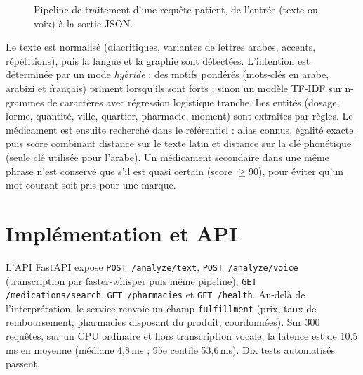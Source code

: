 \documentclass[11pt,a4paper]{article}
\begin{document}
\begin{figure}[htbp]
\caption{Pipeline de traitement d'une requ\^ete patient, de l'entr\'ee (texte ou voix) \`a la sortie JSON.}
\label{fig:pipeline}
\end{figure}
Le texte est normalis\'e (diacritiques, variantes de lettres arabes, accents, r\'ep\'etitions), puis la langue et la graphie sont d\'etect\'ees. L'intention est d\'etermin\'ee par un mode \emph{hybride} : des motifs pond\'er\'es (mots-cl\'es en arabe, arabizi et fran\c{c}ais) priment lorsqu'ils sont forts ; sinon un mod\`ele TF-IDF sur n-grammes de caract\`eres avec r\'egression logistique tranche. Les entit\'es (dosage, forme, quantit\'e, ville, quartier, pharmacie, moment) sont extraites par r\`egles. Le m\'edicament est ensuite recherch\'e dans le r\'ef\'erentiel : alias connus, \'egalit\'e exacte, puis score combinant distance sur le texte latin et distance sur la cl\'e phon\'etique (seule cl\'e utilis\'ee pour l'arabe). Un m\'edicament secondaire dans une m\^eme phrase n'est conserv\'e que s'il est quasi certain (score $\geq 90$), pour \'eviter qu'un mot courant soit pris pour une marque.

\section{Impl\'ementation et API}
L'API FastAPI expose \texttt{POST /analyze/text}, \texttt{POST /analyze/voice} (transcription par faster-whisper puis m\^eme pipeline), \texttt{GET /medications/search}, \texttt{GET /pharmacies} et \texttt{GET /health}. Au-del\`a de l'interpr\'etation, le service renvoie un champ \texttt{fulfillment} (prix, taux de remboursement, pharmacies disposant du produit, coordonn\'ees). Sur 300 requ\^etes, sur un CPU ordinaire et hors transcription vocale, la latence est de 10{,}5\,ms en moyenne (m\'ediane 4{,}8\,ms ; 95e centile 53{,}6\,ms). Dix tests automatis\'es passent.
\end{document}
